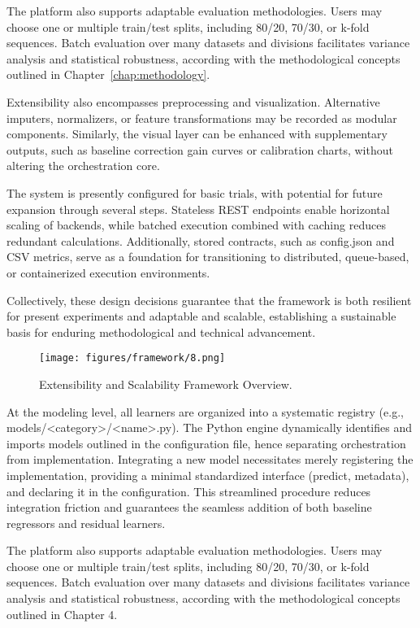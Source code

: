  The platform also supports adaptable evaluation methodologies.  Users may choose one or multiple train/test splits, including 80/20, 70/30, or k-fold sequences.  Batch evaluation over many datasets and divisions facilitates variance analysis and statistical robustness, according with the methodological concepts outlined in Chapter~\ref{chap:methodology}.  

 Extensibility also encompasses preprocessing and visualization.  Alternative imputers, normalizers, or feature transformations may be recorded as modular components.  Similarly, the visual layer can be enhanced with supplementary outputs, such as baseline correction gain curves or calibration charts, without altering the orchestration core.  

The system is presently configured for basic trials, with potential for future expansion through several steps.  Stateless REST endpoints enable horizontal scaling of backends, while batched execution combined with caching reduces redundant calculations. Additionally, stored contracts, such as config.json and CSV metrics, serve as a foundation for transitioning to distributed, queue-based, or containerized execution environments.

 Collectively, these design decisions guarantee that the framework is both resilient for present experiments and adaptable and scalable, establishing a sustainable basis for enduring methodological and technical advancement.


\begin{figure}[H]
 \centering
 \texttt{[image: figures/framework/8.png]}
 \caption[Extensibility and Scalability Framework Overview.]{Extensibility and Scalability Framework Overview.}
 \label{fig:extensibility}
\end{figure}

 At the modeling level, all learners are organized into a systematic registry (e.g., models/<category>/<name>.py).  The Python engine dynamically identifies and imports models outlined in the configuration file, hence separating orchestration from implementation.  Integrating a new model necessitates merely registering the implementation, providing a minimal standardized interface (predict, metadata), and declaring it in the configuration.  This streamlined procedure reduces integration friction and guarantees the seamless addition of both baseline regressors and residual learners.  

 The platform also supports adaptable evaluation methodologies.  Users may choose one or multiple train/test splits, including 80/20, 70/30, or k-fold sequences.  Batch evaluation over many datasets and divisions facilitates variance analysis and statistical robustness, according with the methodological concepts outlined in Chapter 4.  

